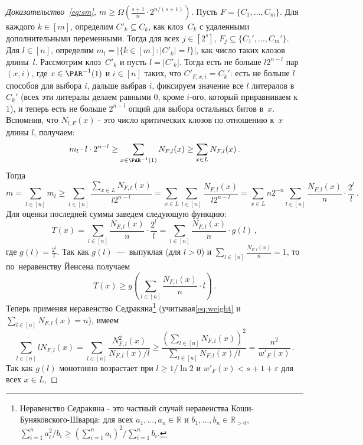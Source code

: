 \begin{proof}[Доказательство~\eqref{eq:sm}, $m \ge \Omega\left(\frac{s+1}{n} \cdot 2^{n/(s+1)}\right)$]
	Пусть $F=\{C_1, \dotsc, C_m\}$. Для каждого $k \in [m]$, определим $C'_k \subseteq C_k$,
	как клоз~$C_k$ с удаленными дополнительными переменными. Тогда для всех
	$j \in [2^s]$, $F_j \subseteq \{C_1', \dotsc, C_m'\}$. Для $l \in [n]$,
	определим $m_l=|\{k \in [m] \colon |C'_k|=l\}|$, как число таких клозов длины~$l$.
	Рассмотрим клоз~$C'_k$
	и пусть $l=|C'_k|$. Тогда есть не больше $l2^{n-l}$ пар $(x,i)$,
	где $x \in \PAR^{-1}(1)$ и $i \in [n]$ таких, что $C'_{F,x,i}=C_k'$:
	есть не больше $l$ способов для выбора $i$, дальше выбрав $i$, 
	фиксируем значение все $l$ литералов в~$C_k'$ 
	(всех эти литералы делаем равными $0$, кроме $i$-ого, который приравниваем к $1$), 
	и теперь есть не больше $2^{n-l}$ опций для выбора остальных битов в~$x$.
	Вспомнив, что $N_{l,F}(x)$ - это число критических клозов по отношению к~$x$ длины $l$, получаем:
	\[m_l \cdot l \cdot 2^{n - l} \ge \sum_{x \in \PAR^{-1}(1)} N_{F,l}(x) \ge \sum_{x \in L} N_{F,l}(x) \, .\]
	Тогда
	\begin{equation}\label{eq:cc}
		m =\sum_{l \in [n]}m_l \ge \sum_{l \in [n]}\frac{\sum_{x \in L} N_{F,l}(x)}{l2^{n-l}}=
		\sum_{x \in L} \sum_{l\in [n]} \frac{N_{F,l}(x)}{l2^{n-l}} =
		\sum_{x \in L} n2^{-n} \sum_{l \in [n]} \frac{N_{F,l}(x)}{n} \cdot \frac{2^l}{l} \, .
	\end{equation}
	Для оценки последней суммы заведем следующую функцию:
	\[T(x)=\sum_{l \in [n]} \frac{N_{F,l}(x)}{n} \cdot \frac{2^l}{l}=\sum_{l \in [n]} \frac{N_{F,l}(x)}{n}\cdot g(l)\,,\]
	где $g(l) = \frac{2^l}{l}$. Так как $g(l)$~---~выпуклая (для $l>0$) и $\sum_{l \in [n]}\frac{N_{F,l}(x)}{n}=1$, то по~неравенству Йенсена получаем
	\begin{equation}\label{eq:aa}
		T(x) \ge g\left(\sum_{l \in [n]} \frac{N_{F,l}(x)}{n}\cdot l\right) \, .
	\end{equation}
	Теперь применяя неравенство Седракяна\footnote{Неравенство Седракяна - это частный случай неравенства Коши-Буняковского-Шварца: для всех $a_1, \dotsc, a_n \in \mathbb R$ и $b_1, \dotsc, b_n \in \mathbb{R}_{>0}$, $\sum_{i=1}^n a_i^2/b_i \ge \left(\sum_{i=1}^n a_i\right)^2/\sum_{i=1}^n b_i$.} (учитывая\eqref{eq:weight} и $\sum_{l \in [n]}N_{F,l}(x)=n$), имеем
	\begin{equation}\label{eq:bb}
		\sum_{l \in [n]} l N_{F,l}(x) = \sum_{l \in [n]} \frac{N_{F,l}^2(x)}{N_{F,l}(x) / l} \ge \frac{(\sum_{l \in [n]} N_{F,l}(x))^2}{\sum_{l \in [n]} N_{F,l}(x) / l} = \frac{n^2}{w'_F(x)} \, .
	\end{equation}
	Так как $g(l)$ монотонно возрастает при $l \ge 1/\ln 2$ и $w'_F(x)<s+1+\varepsilon$ для всех $x \in L$,

\end{proof}
